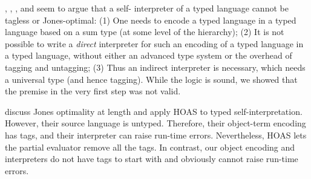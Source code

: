 , \citet{taha-tag}, \citet{xi-guarded}, and
\citet{peyton-jones-simple} seem to argue that a self\hyp
interpreter of a typed language cannot be tagless or Jones\hyp optimal:
(1) One needs to encode a typed language in a typed language based on
a sum type (at some level of the hierarchy);
(2) It is not possible to write a \emph{direct} interpreter 
for such an encoding of a typed language
in a typed language, without either an
advanced type system or the overhead of tagging and untagging;
(3) Thus an indirect interpreter is necessary, which needs a universal
  type (and hence tagging).
While the logic is sound, we showed that the premise in the very first step
was not valid.
\begin{comment}
\Citet{WalidICFP02}, \citet{taha-tag}, \citet{xi-guarded}, and
\citet{peyton-jones-simple} seem to argue as follows that a self\hyp
interpreter of a typed language cannot be tagless or Jones\hyp optimal.
\begin{enumerate*}
\item One needs to encode a typed language in a typed language based on
a sum type (at some level of the hierarchy).
\item It is not possible to write a \emph{direct} interpreter 
for such an encoding of a typed language
in a typed language, without either an
advanced type system or the overhead of tagging and untagging.
\item Thus an indirect interpreter is necessary, which needs a universal
  type (and hence tagging).
\item Thus any self-interpreter must have tags and cannot be 
  Jones-optimal.
\end{enumerate*}
While the logic is sound, we showed that the premise in the very first step
was not valid.
\end{comment}

\citet{Danvy-tagging-encoding} discuss Jones optimality at length and
apply HOAS to typed self\hyp interpretation.  However, their source
language is untyped.  Therefore, their object\hyp term encoding has
tags, and their interpreter can raise run-time errors.
Nevertheless, HOAS lets the partial
evaluator remove all the tags. In contrast, our object encoding and
interpreters do not have tags to start with and obviously cannot
raise run-time errors.

\begin{comment}
  A lot of effort has gone into ``typing dynamic typing'': to statically
  type-check dynamically\hyp typed values
  \cite{baars-typing,haskell-list},
  using the host language's type system to varying extents.
  Our object terms are statically typed, so we would
  need one of these techniques to interpret dynamically\hyp typed
  terms such as those read from a file.
\end{comment}


